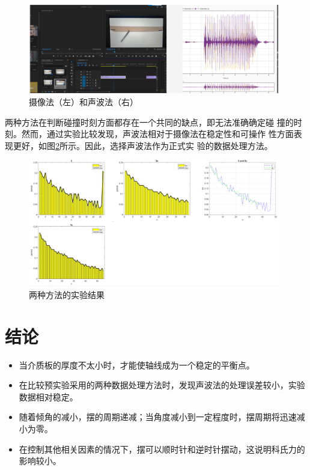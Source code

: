 \documentclass[AutoFakeBold]{LZUThesis}
\begin{document}
\begin{figure}[H]
    \centering
    \includegraphics[width=11cm]{figures/ways.png}
    \caption{摄像法（左）和声波法（右）}
    \label{ways}
\end{figure}
两种方法在判断碰撞时刻方面都存在一个共同的缺点，即无法准确确定碰
撞的时刻。然而，通过实验比较发现，声波法相对于摄像法在稳定性和可操作
性方面表现更好，如图\ref{data_ways}所示。因此，选择声波法作为正式实
验的数据处理方法。


\begin{figure}[H]
    \centering
    \includegraphics[width=11cm]{figures/data_ways.png}
    \caption{两种方法的实验结果}
    \label{data_ways}
\end{figure}

\section{结论}

\begin{itemize}
    \item 当介质板的厚度不太小时，才能使轴线成为一个稳定的平衡点。

    \item 在比较预实验采用的两种数据处理方法时，发现声波法的处理误差较小，实验数据相对稳定。

    \item 随着倾角的减小，摆的周期递减；当角度减小到一定程度时，摆周期将迅速减小为零。

    \item 在控制其他相关因素的情况下，摆可以顺时针和逆时针摆动，这说明科氏力的影响较小。 
\end{itemize}
\end{document}
